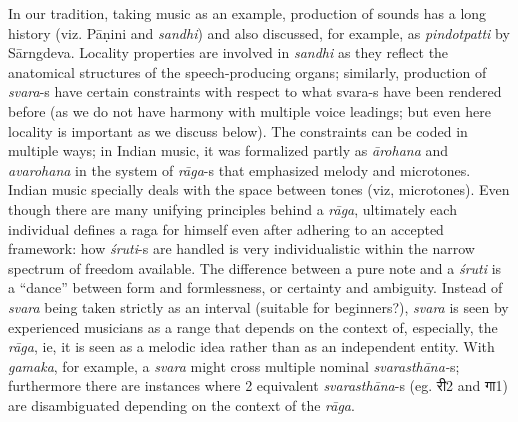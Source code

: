In our tradition, taking music as an example, production of sounds has a long history (viz. Pāṇini and \textsl{sandhi}) and also discussed, for example, as \textsl{pindotpatti} by Sārngdeva. Locality properties are involved in \textsl{sandhi} as they reflect the anatomical structures of the speech-producing organs; similarly, production of \textsl{svara}-s have certain constraints with respect to what svara-s have been rendered before (as we do not have harmony with multiple voice leadings; but even here locality is important as we discuss below). The constraints can be coded in multiple ways; in Indian music, it was formalized partly as \textsl{ārohana} and \textsl{avarohana} in the system of \textsl{rāga}-s that emphasized melody and microtones. Indian music specially deals with the space between tones (viz, microtones). Even though there are many unifying principles behind a \textsl{rāga}, ultimately each individual defines a raga for himself even after adhering to an accepted framework: how \textsl{śruti}-s are handled is very individualistic within the narrow spectrum of freedom available. The difference between a pure note and a \textsl{śruti} is a “dance” between form and formlessness, or certainty and ambiguity. Instead of \textsl{svara} being taken strictly as an interval (suitable for beginners?), \textsl{svara} is seen by experienced musicians as a range that depends on the context of, especially, the \textsl{rāga}, ie, it is seen as a melodic idea rather than as an independent entity. With \textsl{gamaka}, for example, a \textsl{svara} might cross multiple nominal \textsl{svarasthāna-}s; furthermore there are instances where 2 equivalent \textsl{svarasthāna}-s (eg. {\dev री}2 and {\dev गा}1) are disambiguated depending on the context of the \textsl{rāga}.

